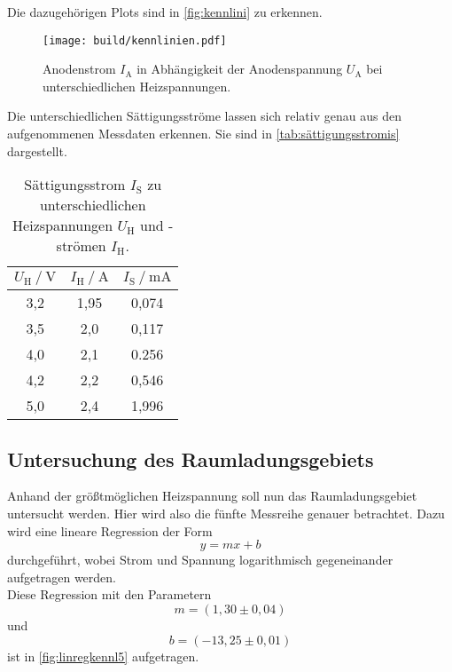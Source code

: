 Die dazugehörigen Plots sind in \autoref{fig:kennlini} zu erkennen.

\begin{figure}[H]
    \centering
    \texttt{[image: build/kennlinien.pdf]}
    \caption{Anodenstrom $I_\text{A}$ in Abhängigkeit der Anodenspannung $U_\text{A}$ bei unterschiedlichen Heizspannungen.}
    \label{fig:kennlini}
\end{figure}

Die unterschiedlichen Sättigungsströme lassen sich relativ genau aus den aufgenommenen Messdaten erkennen.
Sie sind in \autoref{tab:sättigungsstromis} dargestellt.

\begin{table}
    \centering
    \caption{Sättigungsstrom $I_\text{S}$ zu unterschiedlichen \\ Heizspannungen $U_\text{H}$ und -strömen $I_\text{H}$.}
    \label{tab:sättigungsstromis}
    \begin{tabular}{S S[table-format=1.2] S}
        \toprule
        {$U_\text{H} \mathbin{/} \unit{\volt}$} & {$I_\text{H} \mathbin{/} \unit{\ampere}$} & {$I_\text{S} \mathbin{/} \unit{\milli\ampere}$} \\
        \midrule
            {3,2} & {1,95}&{0,074}\\
            {3,5} & {2,0} &{0,117}\\
            {4,0} & {2,1} &{0.256}\\
            {4,2} & {2,2} &{0,546}\\
            {5,0} & {2,4} &{1,996}\\
        \bottomrule
    \end{tabular}
\end{table}


\subsection{Untersuchung des Raumladungsgebiets}

Anhand der größtmöglichen Heizspannung soll nun das Raumladungsgebiet untersucht werden.
Hier wird also die fünfte Messreihe genauer betrachtet.
Dazu wird eine lineare Regression der Form
\begin{equation*}
    y = m x + b
\end{equation*}
durchgeführt, wobei Strom und Spannung logarithmisch gegeneinander aufgetragen werden. \\

Diese Regression mit den Parametern
\begin{equation*}
    m = ( 1,30 \pm 0,04)
\end{equation*}
und
\begin{equation*}
    b = (-13,25 \pm 0,01)
\end{equation*}
ist in \autoref{fig:linregkennl5} aufgetragen.

